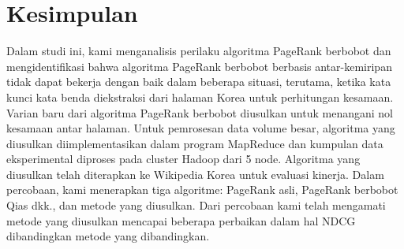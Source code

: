 \documentclass[conference]{IEEEtran}
\begin{document}
\section{Kesimpulan}

Dalam studi ini, kami menganalisis perilaku algoritma PageRank berbobot dan mengidentifikasi bahwa algoritma PageRank berbobot berbasis antar-kemiripan tidak dapat bekerja dengan baik dalam beberapa situasi, terutama, ketika kata kunci kata benda diekstraksi dari halaman Korea untuk perhitungan kesamaan.
Varian baru dari algoritma PageRank berbobot diusulkan untuk menangani nol kesamaan antar halaman. Untuk pemrosesan data volume besar, algoritma yang diusulkan diimplementasikan dalam program MapReduce dan kumpulan data eksperimental diproses pada cluster Hadoop dari 5 node.
Algoritma yang diusulkan telah diterapkan ke Wikipedia Korea untuk evaluasi kinerja. Dalam percobaan, kami menerapkan tiga algoritme: PageRank asli, PageRank berbobot Qias dkk.\cite{qiao2010simrank}, dan metode yang diusulkan.
Dari percobaan kami telah mengamati metode yang diusulkan mencapai beberapa perbaikan dalam hal NDCG dibandingkan metode yang dibandingkan.



\end{document}
